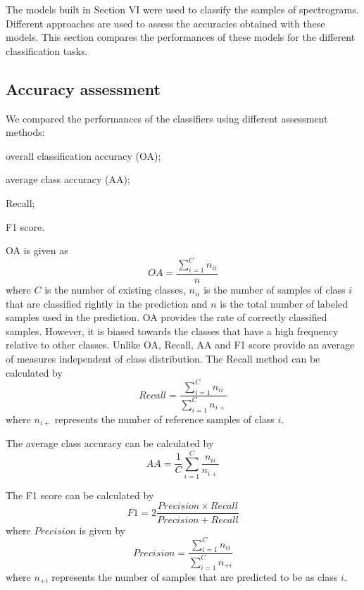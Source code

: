 The models built in Section VI were used to classify the samples of spectrograms. Different approaches are used to assess the accuracies obtained with these models. This section compares the performances of these models for the different classification tasks. 
\subsection{Accuracy assessment}
We compared the performances of the classifiers using different assessment methods: \begin{enumerate*} \item overall classification accuracy (OA); \item average class accuracy (AA); \item Recall; \item F1 score.\end{enumerate*} OA is given as
\begin{equation}
OA=\frac{\sum_{i=1}^{C}n_{ii}}{n}
\end{equation}
where $C$ is the number of existing classes,  $n_{ii}$ is the number of samples of class $i$ that are classified rightly in the prediction and $n$ is the total number of labeled samples used in the prediction. OA provides the rate of correctly classified samples. However, it is biased towards the classes that have a high frequency relative to other classes. Unlike OA, Recall, AA and F1 score provide an average of measures independent of class distribution. The Recall method can be calculated by
\begin{equation}
Recall=\frac{\sum_{i=1}^{C}n_{ii}}{\sum_{i=1}^{C}n_{i+}}
\end{equation}
where $n_{i+}$ represents the number of reference samples of class $i$.

The average class accuracy can be calculated by
\begin{equation}
AA=\frac{1}{C}\sum_{i=1}^{C}\frac{n_{ii}}{n_{i+}}
\end{equation}

The F1 score can be calculated by 
\begin{equation}
F1= 2 \frac{ Precision \times Recall}{Precision+Recall}
\end{equation}
where $Precision$ is given by
\begin{equation}
Precision=\frac{\sum_{i=1}^{C}n_{ii}}{\sum_{i=1}^{C}n_{+i}}
\end{equation}
where $n_{+i}$ represents the number of samples that are  predicted to be as class $i$.

